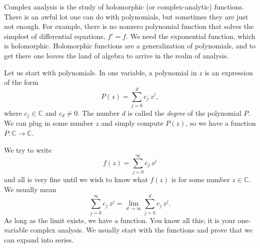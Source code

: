 \documentclass[12pt,openany]{book}
\newcommand{\C}{{\mathbb{C}}}
\theoremstyle{plain}
\theoremstyle{remark}
\theoremstyle{definition}
\theoremstyle{exercise}
\theoremstyle{example}
\begin{document}
\medskip

Complex analysis is the study of holomorphic (or complex-analytic)
functions.
There is an awful lot one can do with polynomials, but sometimes they are
just not enough.  For example, there is no nonzero polynomial function that solves
the simplest of differential equations, $f' = f$.  We need the exponential
function, which is holomorphic.  
Holomorphic functions are a generalization of polynomials,
and to get there one leaves the land of algebra to arrive in the realm of
analysis.

Let us start with polynomials.  In one variable, a polynomial in $z$ is
an expression of the form
\begin{equation*}
P(z) = \sum_{j=0}^d c_j \, z^j ,
\end{equation*}
where $c_j \in \C$ and $c_d \not= 0$.  The number $d$ is called the
\emph{degree}
of the
polynomial $P$.  We can plug in some number $z$ and simply compute
$P(z)$, so we have a function $P \colon \C \to \C$.

We try to write
\begin{equation*}
f(z) = \sum_{j=0}^\infty c_j \, z^j
\end{equation*}
and all is very fine until we wish to know what $f(z)$ is for some number
$z \in \C$.
We usually mean 
\begin{equation*}
\sum_{j=0}^\infty c_j \, z^j
=
\lim_{d\to\infty}
\sum_{j=0}^d c_j \, z^j .
\end{equation*}
As long as the limit exists, we have a function.  You know all
this; it is your one-variable complex analysis.  We usually
start with the functions and prove that we can expand into series.
\end{document}
